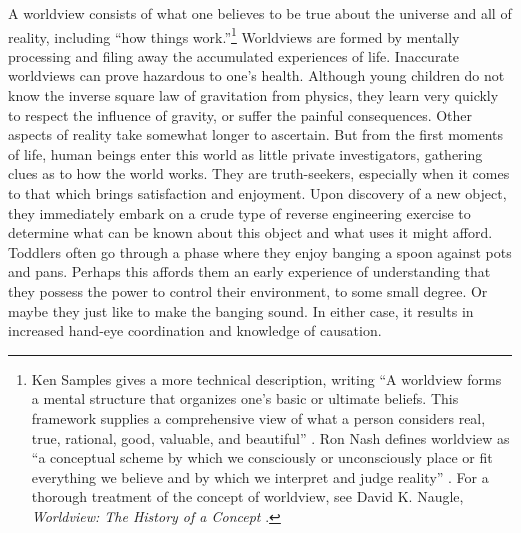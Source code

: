 A worldview consists of what one believes to be true about the universe
and all of reality, including “how things work.”\footnote{Ken Samples gives a more technical description,
writing “A worldview forms a mental structure that organizes one’s
basic or ultimate beliefs. This framework supplies a comprehensive view
of what a person considers real, true, rational, good, valuable, and
beautiful” \citep[][p.~20]{samples2007}.
Ron Nash defines worldview as “a conceptual scheme by
which we consciously or unconsciously place or fit everything we
believe and by which we interpret and judge reality” \citep[][p.~24]{nash1988}.
For a thorough treatment of the concept
of worldview, see David K. Naugle, \textit{Worldview: The History of a
Concept} \citep{naugle2002}.
} 
Worldviews are formed by mentally processing and filing away the
accumulated experiences of life. Inaccurate worldviews can prove
hazardous to one’s health. Although young children do not know the
inverse square law of gravitation from physics, they learn very quickly
to respect the influence of gravity, or suffer the painful
consequences. Other aspects of reality take somewhat longer to
ascertain. But from the first moments of life, human beings enter this
world as little private investigators, gathering clues as to how the world
works. They are truth-seekers, especially when it comes to that which
brings satisfaction and enjoyment. Upon discovery of a new object, they
immediately embark on a crude type of reverse engineering exercise to
determine what can be known about this object and what uses it might
afford. Toddlers often go through a phase where they enjoy banging a
spoon against pots and pans. Perhaps this affords them an early
experience of understanding that they possess the power to control
their environment, to some small degree. Or maybe they just like to
make the banging sound. In either case, it results in increased
hand-eye coordination and knowledge of causation.

